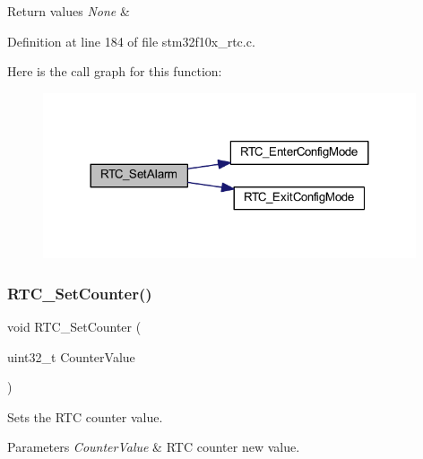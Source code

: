 \begin{DoxyRetVals}{Return values}
{\em None} & \\
\hline
\end{DoxyRetVals}


Definition at line 184 of file stm32f10x\+\_\+rtc.\+c.

Here is the call graph for this function\+:
\nopagebreak
\begin{figure}[H]
\begin{center}
\leavevmode
\includegraphics[width=312pt]{group___r_t_c___private___functions_gaec644c636a30ab5e287ba60ffc77132c_cgraph}
\end{center}
\end{figure}
\mbox{\label{group___r_t_c___private___functions_gafa81ec17158de1d1a7740eca81b9fb65}} 
\subsubsection{\texorpdfstring{R\+T\+C\+\_\+\+Set\+Counter()}{RTC\_SetCounter()}}
{\footnotesize\ttfamily void R\+T\+C\+\_\+\+Set\+Counter (\begin{DoxyParamCaption}\item[{uint32\+\_\+t}]{Counter\+Value }\end{DoxyParamCaption})}



Sets the R\+TC counter value. 


\begin{DoxyParams}{Parameters}
{\em Counter\+Value} & R\+TC counter new value. \\
\hline
\end{DoxyParams}

